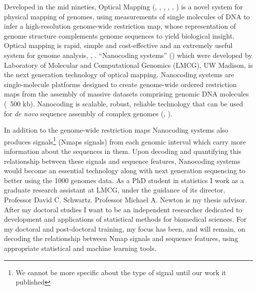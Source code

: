 \documentclass[12pt]{extarticle} %
\begin{document}
Developed in the mid nineties, Optical Mapping (\cite{Schwartz_etal_1993_Science}, \cite{Valouev_2006_PhDThesis}, \cite{Valouev_etal_2006_JCB}, \cite{Valouev_etal_2006_PNAS}, \cite{Valouev_etal_2006_BioInfo}, \cite{Teague_2012_PhDThesis}) is a novel system for physical mapping of genomes, using measurements of single molecules of DNA to infer a high-resolution genome-wide restriction map, whose representation of genome structure complements genome sequences to yield biological insight. Optical mapping is rapid, simple and cost-effective and an extremely useful system for genome analysis, \cite{Teague_etal_2010_PNAS}, \cite{Sarkar_etal_2012_JCB}. ``Nanocoding systems'' (\cite{Jo_etal_2007_PNAS}) which were developed by Laboratory of Molecular and Computational Genomics (LMCG), UW Madison, is the next generation technology of optical mapping. Nanocoding systems are single-molecule platforms designed to create genome-wide ordered restriction maps from the assembly of massive datasets comprising genomic DNA molecules (~500 kb). Nanocoding is scalable, robust, reliable technology that can be used for {\it{de novo}} sequence assembly of complex genomes (\cite{Zhou_etal_2009_PLOS-Genetics}, \cite{Reisner_etal_2010_PNAS}). 

In addition to the genome-wide restriction maps Nanocoding systems also produces signals\footnote{We cannot be more specific about the type of signal until our work it published} (Nmaps signals) from each genomic interval which carry more information about the sequences in them. Upon decoding and quantifying this relationship between these signals and sequence features, Nanocoding systems would become an essential technology along with next generation sequencing to better using the 1000 genomes data. As a PhD student in statistics I work as a graduate research assistant at LMCG, under the guidance of its director, Professor David C. Schwartz. Professor Michael A. Newton is my thesis advisor. After my doctoral studies I want to be an independent researcher dedicated to development and applications of statistical methods for biomedical sciences. For my doctoral and post-doctoral training, my focus has been, and will remain, on decoding the relationship between Nmap signals and sequence features, using appropriate statistical and machine learning tools. 
\end{document}
